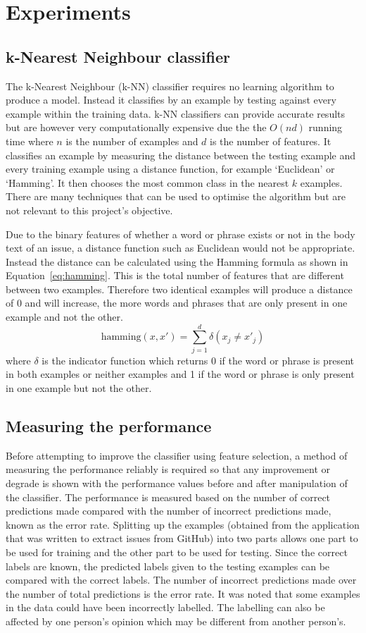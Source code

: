 \section{Experiments}
\subsection{k-Nearest Neighbour classifier}
The k-Nearest Neighbour (k-NN) classifier requires no learning algorithm to produce a model. Instead it classifies by an example
by testing against every example within the training data. k-NN classifiers can provide accurate results but are however very
computationally expensive due the the $O(nd)$ running time where $n$ is the number of examples and $d$ is the number of
features. It classifies an example by measuring the distance between the testing example and every training example using a
distance function, for example `Euclidean' or `Hamming'. It then chooses the most common class in the nearest $k$ examples.
There are many techniques that can be used to optimise the algorithm but are not relevant to this project's objective.

Due to the binary features of whether a word or phrase exists or not in the body text of an issue, a distance function such as
Euclidean would not be appropriate. Instead the distance can be calculated using the Hamming formula as shown in
Equation~\ref{eq:hamming}. This is the total number of features that are different between two examples. Therefore two identical
examples will produce a distance of 0 and will increase, the more words and phrases that are only present in one example and not
the other.
\begin{equation}
	\label{eq:hamming}
	\mathrm{hamming}(x,x') = \sum^d_{j=1} \delta (x_{j} \neq x'_{j})
\end{equation}
where $\delta$ is the indicator function which returns 0 if the word or phrase is present in both examples or neither examples
and 1 if the word or phrase is only present in one example but not the other.

\subsection{Measuring the performance}
Before attempting to improve the classifier using feature selection, a method of measuring the performance reliably is required
so that any improvement or degrade is shown with the performance values before and after manipulation of the classifier. The
performance is measured based on the number of correct predictions made compared with the number of incorrect predictions made,
known as the error rate. Splitting up the examples (obtained from the application that was written to extract issues from
GitHub) into two parts allows one part to be used for training and the other part to be used for testing. Since the correct
labels are known, the predicted labels given to the testing examples can be compared with the correct labels. The number of
incorrect predictions made over the number of total predictions is the error rate. It was noted that some examples in the data
could have been incorrectly labelled. The labelling can also be affected by one person's opinion which may be different from
another person's.

